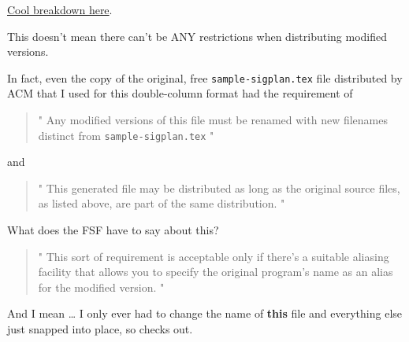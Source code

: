 \documentclass[sigplan,screen]{acmart}
\begin{document}
\href{https://www.gnu.org/philosophy/categories.html}{Cool breakdown here}. \cite{free-categories}

This doesn't mean there can't be ANY restrictions when distributing modified versions.

In fact, even the copy of the original, free \verb|sample-sigplan.tex| file distributed by ACM that I used for this double-column format had the requirement of

\begin{quote}
	"
	Any modified versions of this file must be renamed
 with new filenames distinct from \verb|sample-sigplan.tex|
	"
\end{quote}
and
\begin{quote}
	"
	This generated file may be distributed as long as the
 original source files, as listed above, are part of the
 same distribution.
	"
\end{quote}
What does the FSF have to say about this?
\begin{quote}
	"
	This sort of requirement is acceptable only if there's a suitable aliasing facility that allows you to specify the original program's name as an alias for the modified version.
	"
\end{quote}
And I mean … I only ever had to change the name of \textbf{this} file and everything else just snapped into place, so checks out.

\nocite{*}




\end{document}
